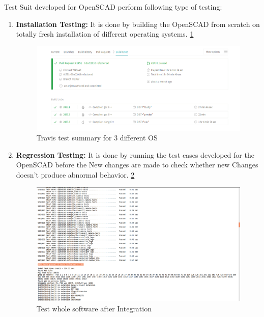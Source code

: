 Test Suit developed for OpenSCAD perform following type of testing:
 
 \begin{enumerate}
     \item \textbf{Installation Testing:} It is done by building the OpenSCAD from scratch on totally fresh installation of different operating systems. \ref{fig:travis}
   
     \begin{figure}
         \centering
         \includegraphics[width=\linewidth]{images/travis}
         \caption{Travis test summary for 3 different OS }
         \label{fig:travis}
     \end{figure}
   
     \item \textbf{Regression Testing:} It is done by running the test cases developed for the OpenSCAD before the New changes are made to check whether new Changes doesn't produce abnormal behavior. \ref{fig:generalTest}
   
     \begin{figure}
         \centering
         \includegraphics[width=\linewidth]{images/generalTest}
         \caption{Test whole software after Integration}
         \label{fig:generalTest}
     \end{figure}
   

\end{enumerate}
